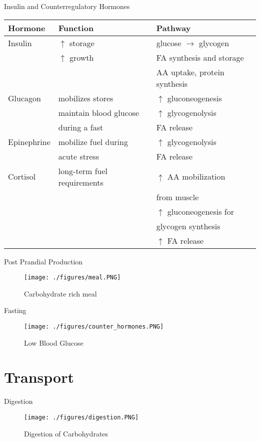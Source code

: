 \documentclass[presentation, smaller]{beamer}
\begin{document}
\begin{frame}[label={sec:org7b513fe}]{Insulin and Counterregulatory Hormones}
\begin{center}
\begin{tabular}{lll}
Hormone & Function & Pathway\\
\hline
Insulin & \(\uparrow\) storage & glucose \(\to\) glycogen\\
 & \(\uparrow\) growth & FA synthesis and storage\\
 &  & AA uptake, protein synthesis\\
\hline
Glucagon & mobilizes stores & \(\uparrow\) gluconeogenesis\\
 & maintain blood glucose & \(\uparrow\) glycogenolysis\\
 & during a fast & FA release\\
\hline
Epinephrine & mobilize fuel during & \(\uparrow\) glycogenolysis\\
 & acute stress & FA release\\
\hline
Cortisol & long-term fuel requirements & \(\uparrow\) AA mobilization\\
 &  & from muscle\\
 &  & \(\uparrow\) gluconeogenesis for\\
 &  & glycogen synthesis\\
 &  & \(\uparrow\) FA release\\
\end{tabular}
\end{center}
\end{frame}

\begin{frame}[label={sec:org0e5d7cd}]{Post Prandial Production}
\begin{figure}[htbp]
\centering
\texttt{[image: ./figures/meal.PNG]}
\caption{\label{fig:org9903ab2}
Carbohydrate rich meal}
\end{figure}
\end{frame}

\begin{frame}[label={sec:org583420e}]{Fasting}
\begin{figure}[htbp]
\centering
\texttt{[image: ./figures/counter\_hormones.PNG]}
\caption{\label{fig:org7964309}
Low Blood Glucose}
\end{figure}
\end{frame}

\section{Transport}
\label{sec:org9642a58}
\begin{frame}[label={sec:orgfc551ca}]{Digestion}
\begin{figure}[htbp]
\centering
\texttt{[image: ./figures/digestion.PNG]}
\caption{\label{fig:org906a726}
Digestion of Carbohydrates}
\end{figure}
\end{frame}
\end{document}

